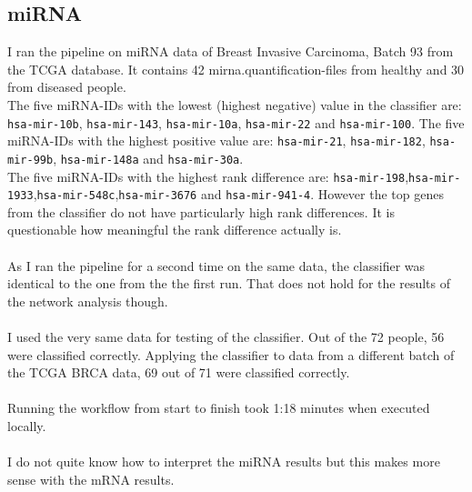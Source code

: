 \documentclass{bioinfo}
\begin{document}
\subsection{miRNA}
I ran the pipeline on miRNA data of Breast Invasive Carcinoma, Batch 93 from the TCGA database. It contains 42 mirna.quantification-files from healthy and 30 from diseased people.\\
The five miRNA-IDs with the lowest (highest negative) value in the classifier are: \texttt{hsa-mir-10b}, \texttt{hsa-mir-143}, \texttt{hsa-mir-10a}, \texttt{hsa-mir-22} and \texttt{hsa-mir-100}. The five miRNA-IDs with the highest positive value are: \texttt{hsa-mir-21}, \texttt{hsa-mir-182}, \texttt{hsa-mir-99b}, \texttt{hsa-mir-148a} and \texttt{hsa-mir-30a}.\\
The five miRNA-IDs with the highest rank difference are: \texttt{hsa-mir-198},\texttt{hsa-mir-1933},\texttt{hsa-mir-548c},\texttt{hsa-mir-3676} and \texttt{hsa-mir-941-4}. However the top genes from the classifier do not have particularly high rank differences. It is questionable how meaningful the rank difference actually is.\\\\
As I ran the pipeline for a second time on the same data, the classifier was identical to the one from the the first run. That does not hold for the results of the network analysis though.\\\\
I used the very same data for testing of the classifier. Out of the 72 people, 56 were classified correctly. Applying the classifier to data from a different batch of the TCGA BRCA data, 69 out of 71 were classified correctly.\\\\
Running the workflow from start to finish took 1:18 minutes when executed locally.\\\\
I do not quite know how to interpret the miRNA results but this makes more sense with the mRNA results.
\end{document}
